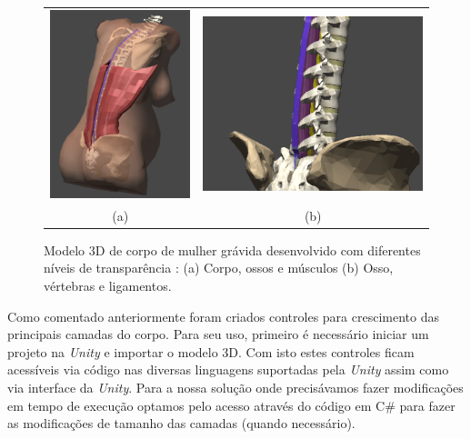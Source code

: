 \begin{figure}[ht!]
    \centering
        \begin{tabular}{cc}
        \includegraphics[width=0.4\linewidth]{capitulos/figuras/modelo corpo 3d.PNG} & 
        \includegraphics[width=0.6\linewidth]{capitulos/figuras/modelo corpo 3d - coluna vertebral, ligamentos supra, interespinhoso and flavum.PNG} 
        \\
        (a) & (b)
        \end{tabular}
    \caption{Modelo 3D de corpo de mulher grávida desenvolvido com diferentes níveis de transparência \cite{Melo2021}: (a) Corpo, ossos e músculos (b) Osso, vértebras e ligamentos.}
    \label{fig:modelo3Dcorpo}
\end{figure}

Como comentado anteriormente foram criados controles para crescimento das principais camadas do corpo. Para seu uso, primeiro é necessário iniciar um projeto na \textit{Unity} e importar o modelo 3D. Com isto estes controles ficam acessíveis via código nas diversas linguagens suportadas pela \textit{Unity} assim como via interface da \textit{Unity}. Para a nossa solução onde precisávamos fazer modificações em tempo de execução optamos pelo acesso através do código em C\# para fazer as modificações de tamanho das camadas (quando necessário). 

